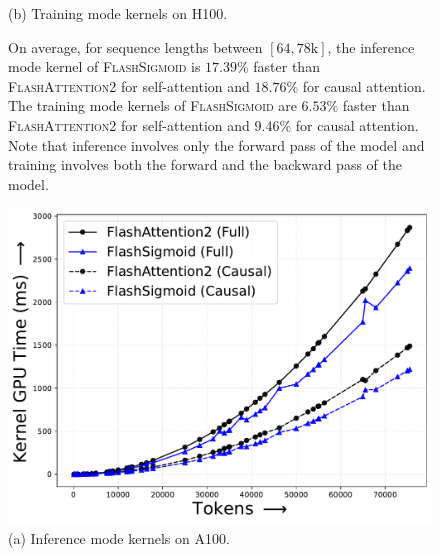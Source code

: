 \begin{figure}[!htbp]
\begin{minipage}{0.46\textwidth}
        \captionsetup{justification=centering} 
        \caption*{
            (b) Training mode kernels on H100.
        }
    \end{minipage}
    \caption{
        On average, for sequence lengths between $[64, 78\mathrm{k}]$, the inference mode kernel of \textsc{FlashSigmoid} is ${17.39}\%$ faster than \textsc{FlashAttention2} for self-attention and ${18.76}\%$ for causal attention.
        The training mode kernels of \textsc{FlashSigmoid} are ${6.53}\%$ faster than \textsc{FlashAttention2} for self-attention and ${9.46}\%$ for causal attention.
        Note that inference involves only the forward pass of the model and training involves both the forward and the backward pass of the model. 
    }
    \label{fig:h100-softmax-sigmoid-fwd-bwd}
\end{figure}
\begin{figure}[!htbp]
    \centering
    \begin{minipage}{0.46\textwidth}
        \footnotesize
        \centering
        \includegraphics[trim={0 0 0 0}, width=\textwidth]{figures/_flash_figures/final_arxiv/f2/a100/A100_noalibi_FWD_Full_14.33_0.05_Causal_16.92_0.09.pdf}
        \captionsetup{justification=centering}
        \caption*{
            (a) Inference mode kernels on A100.
        }
    \end{minipage}
    \hfill
    \begin{minipage}{0.46\textwidth}
        \centering        

\end{minipage}
\end{figure}

